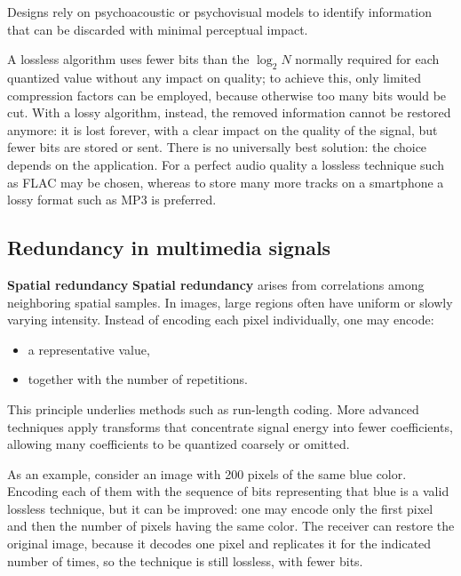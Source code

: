 Designs rely on psychoacoustic or psychovisual models to identify information that can be discarded with minimal perceptual impact.

A lossless algorithm uses fewer bits than the $\log_2 N$ normally required for each quantized value without any impact on quality; to achieve this, only limited compression factors can be employed, because otherwise too many bits would be cut. With a lossy algorithm, instead, the removed information cannot be restored anymore: it is lost forever, with a clear impact on the quality of the signal, but fewer bits are stored or sent. There is no universally best solution: the choice depends on the application. For a perfect audio quality a lossless technique such as FLAC may be chosen, whereas to store many more tracks on a smartphone a lossy format such as MP3 is preferred.


\subsection{Redundancy in multimedia signals}

\textbf{Spatial redundancy} \textbf{Spatial redundancy} arises from correlations among neighboring spatial samples. In images, large regions often have uniform or slowly varying intensity. Instead of encoding each pixel individually, one may encode:

\begin{itemize}
\item a representative value,
\item together with the number of repetitions.
\end{itemize}

This principle underlies methods such as run-length coding. More advanced techniques apply transforms that concentrate signal energy into fewer coefficients, allowing many coefficients to be quantized coarsely or omitted.

\begin{center}
\end{center}

As an example, consider an image with 200 pixels of the same blue color. Encoding each of them with the sequence of bits representing that blue is a valid lossless technique, but it can be improved: one may encode only the first pixel and then the number of pixels having the same color. The receiver can restore the original image, because it decodes one pixel and replicates it for the indicated number of times, so the technique is still lossless, with fewer bits.

